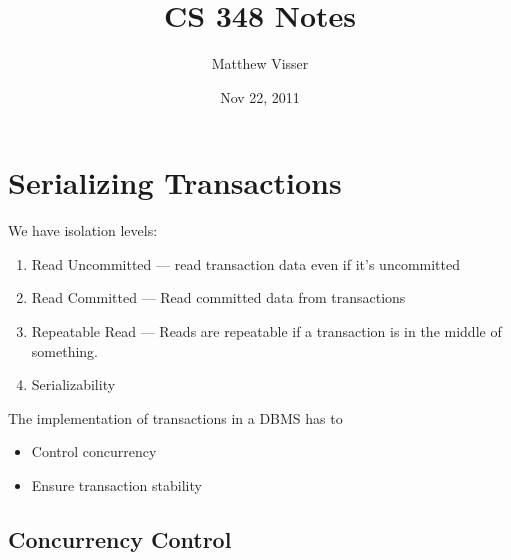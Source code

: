 \documentclass[12pt]{article}
\begin{document}
\title{CS 348 Notes}
\author{Matthew Visser}
\date{Nov 22, 2011}
\maketitle

\section{Serializing Transactions}

We have isolation levels:
\begin{enumerate}[1.]
	\item Read Uncommitted --- read transaction data even if it's uncommitted
	\item Read Committed --- Read committed data from transactions
	\item Repeatable Read --- Reads are repeatable if a transaction is in the
		middle of something.
	\item Serializability
\end{enumerate}

The implementation of transactions in a DBMS has to
\begin{itemize}
	\item Control concurrency
	\item Ensure transaction stability
\end{itemize}

\subsection{Concurrency Control}
\end{document}
